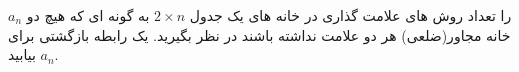\exercise
$a_n$
 را تعداد روش های علامت گذاری در خانه های یک جدول
$2 \times n$
به گونه ای که هیچ دو خانه مجاور(ضلعی) هر دو علامت نداشته باشند در نظر بگیرید. یک رابطه بازگشتی برای
$a_n$
بیابید.